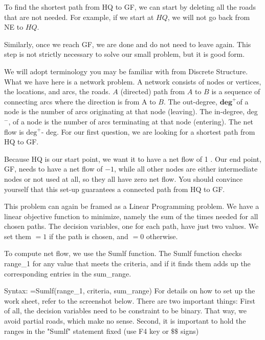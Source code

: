 \documentclass[10pt]{article}
\begin{document}
To find the shortest path from HQ to GF, we can start by deleting all the roads that are not needed. For example, if we start at $H Q$, we will not go back from NE to $H Q$.

Similarly, once we reach GF, we are done and do not need to leave again. This step is not strictly necessary to solve our small problem, but it is good form.

We will adopt terminology you may be familiar with from Discrete Structure. What we have here is a network problem. A network consists of nodes or vertices, the locations, and arcs, the roads. $A$ (directed) path from $A$ to $B$ is a sequence of connecting arcs where the direction is from A to $B$. The out-degree, $\mathbf{d e g}^{+}$of a node is the number of arcs originating at that node (leaving). The in-degree, deg $^{-}$, of a node is the number of arcs terminating at that node (entering). The net flow is $\mathrm{deg}^{+}$- deg. For our first question, we are looking for a shortest path from HQ to GF.

Because HQ is our start point, we want it to have a net flow of 1 . Our end point, GF, needs to have a net flow of $-1$, while all other nodes are either intermediate nodes or not used at all, so they all have zero net flow. You should convince yourself that this set-up guarantees a connected path from HQ to GF.

This problem can again be framed as a Linear Programming problem. We have a linear objective function to minimize, namely the sum of the times needed for all chosen paths. The decision variables, one for each path, have just two values. We set them $=1$ if the path is chosen, and $=0$ otherwise.

To compute net flow, we use the Sumlf function. The Sumlf function checks range\_1 for any value that meets the criteria, and if it finds them adds up the corresponding entries in the sum\_range.

Syntax: =Sumlf(range\_1, criteria, sum\_range) For details on how to set up the work sheet, refer to the screenshot below. There are two important things: First of all, the decision variables need to be constraint to be binary. That way, we avoid partial roads, which make no sense. Second, it is important to hold the ranges in the "Sumlf" statement fixed (use F4 key or $\$ \$$ signs)
\end{document}
